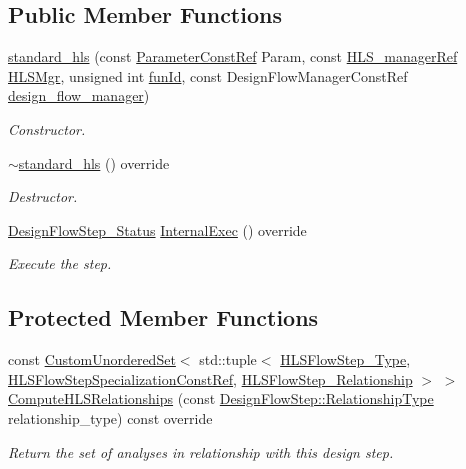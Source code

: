 \subsection*{Public Member Functions}
\begin{DoxyCompactItemize}
\item 
\hyperlink{classstandard__hls_aaf82a542e4a533eda425fbc186971954}{standard\+\_\+hls} (const \hyperlink{Parameter_8hpp_a37841774a6fcb479b597fdf8955eb4ea}{Parameter\+Const\+Ref} Param, const \hyperlink{hls__manager_8hpp_acd3842b8589fe52c08fc0b2fcc813bfe}{H\+L\+S\+\_\+manager\+Ref} \hyperlink{classHLS__step_ade85003a99d34134418451ddc46a18e9}{H\+L\+S\+Mgr}, unsigned int \hyperlink{classHLSFunctionStep_a3e6434fd86c698b0c70520b859bff5b0}{fun\+Id}, const Design\+Flow\+Manager\+Const\+Ref \hyperlink{classDesignFlowStep_ab770677ddf087613add30024e16a5554}{design\+\_\+flow\+\_\+manager})
\begin{DoxyCompactList}\small\item\em Constructor. \end{DoxyCompactList}\item 
\hyperlink{classstandard__hls_a7a265edcf53d0a76600cf3f079eba1da}{$\sim$standard\+\_\+hls} () override
\begin{DoxyCompactList}\small\item\em Destructor. \end{DoxyCompactList}\item 
\hyperlink{design__flow__step_8hpp_afb1f0d73069c26076b8d31dbc8ebecdf}{Design\+Flow\+Step\+\_\+\+Status} \hyperlink{classstandard__hls_a4ee80875c48a659dbee7f3081c2f882d}{Internal\+Exec} () override
\begin{DoxyCompactList}\small\item\em Execute the step. \end{DoxyCompactList}\end{DoxyCompactItemize}
\subsection*{Protected Member Functions}
\begin{DoxyCompactItemize}
\item 
const \hyperlink{classCustomUnorderedSet}{Custom\+Unordered\+Set}$<$ std\+::tuple$<$ \hyperlink{hls__step_8hpp_ada16bc22905016180e26fc7e39537f8d}{H\+L\+S\+Flow\+Step\+\_\+\+Type}, \hyperlink{hls__step_8hpp_a5fdd2edf290c196531d21d68e13f0e74}{H\+L\+S\+Flow\+Step\+Specialization\+Const\+Ref}, \hyperlink{hls__step_8hpp_a3ad360b9b11e6bf0683d5562a0ceb169}{H\+L\+S\+Flow\+Step\+\_\+\+Relationship} $>$ $>$ \hyperlink{classstandard__hls_a7a8577eba64be4ca572350446879d82c}{Compute\+H\+L\+S\+Relationships} (const \hyperlink{classDesignFlowStep_a723a3baf19ff2ceb77bc13e099d0b1b7}{Design\+Flow\+Step\+::\+Relationship\+Type} relationship\+\_\+type) const override
\begin{DoxyCompactList}\small\item\em Return the set of analyses in relationship with this design step. \end{DoxyCompactList}\end{DoxyCompactItemize}
